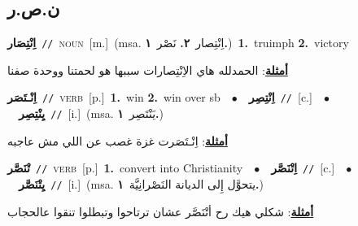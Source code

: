 \documentclass[10pt,a4paper,twoside]{article} %
\begin{document}
\begin{multicols}{2}
\vspace{-3mm}
\subsection*{\color{blue}\foreignlanguage{arabic}{ن.ص.ر}\color{blue}{}} 

{\setlength\topsep{0pt}\textbf{\foreignlanguage{arabic}{اِنْتِصَار}}\ {\color{gray}\texttt{//}\color{black}}\ \textsc{noun}\ [m.]\ \color{gray}(msa. \foreignlanguage{arabic}{اِنْتِصار}~\foreignlanguage{arabic}{\textbf{٢.}}  \foreignlanguage{arabic}{نَصْر}~\foreignlanguage{arabic}{\textbf{١.}})\color{black}\ \textbf{1.}~truimph  \textbf{2.}~victory\  \begin{flushright}\color{gray}\foreignlanguage{arabic}{\textbf{\underline{\foreignlanguage{arabic}{أمثلة}}}: الحمدلله هاي الاِنْتِصارات سببها هو لحمتنا ووحدة صفنا}\end{flushright}\color{black}} \vspace{2mm}

{\setlength\topsep{0pt}\textbf{\foreignlanguage{arabic}{اِنْـتَصَر}}\ {\color{gray}\texttt{//}\color{black}}\ \textsc{verb}\ [p.]\ \textbf{1.}~win  \textbf{2.}~win over sb\ \ $\bullet$\ \ \setlength\topsep{0pt}\textbf{\foreignlanguage{arabic}{اِنْتِصِر}}\ {\color{gray}\texttt{//}\color{black}}\ [c.]\ \ $\bullet$\ \ \setlength\topsep{0pt}\textbf{\foreignlanguage{arabic}{يِنْتِصِر}}\ {\color{gray}\texttt{//}\color{black}}\ [i.]\ \color{gray}(msa. \foreignlanguage{arabic}{يَنْتَصِر}~\foreignlanguage{arabic}{\textbf{١.}})\color{black}\  \begin{flushright}\color{gray}\foreignlanguage{arabic}{\textbf{\underline{\foreignlanguage{arabic}{أمثلة}}}: اِنْـتَصَرت غزة غصب عن اللي مش عاجبه}\end{flushright}\color{black}} \vspace{2mm}

{\setlength\topsep{0pt}\textbf{\foreignlanguage{arabic}{تْنَصَّر}}\ {\color{gray}\texttt{//}\color{black}}\ \textsc{verb}\ [p.]\ \textbf{1.}~convert into Christianity\ \ $\bullet$\ \ \setlength\topsep{0pt}\textbf{\foreignlanguage{arabic}{اِتْنَصَّر}}\ {\color{gray}\texttt{//}\color{black}}\ [c.]\ \ $\bullet$\ \ \setlength\topsep{0pt}\textbf{\foreignlanguage{arabic}{يِتْنَصَّر}}\ {\color{gray}\texttt{//}\color{black}}\ [i.]\ \color{gray}(msa. \foreignlanguage{arabic}{يتحوَّل إِلى الديانة النَصْرانِيَّة}~\foreignlanguage{arabic}{\textbf{١.}})\color{black}\  \begin{flushright}\color{gray}\foreignlanguage{arabic}{\textbf{\underline{\foreignlanguage{arabic}{أمثلة}}}: شكلي هيك رح أتْنَصَّر عشان ترتاحوا وتبطلوا تنقوا عالحجاب}\end{flushright}\color{black}} \vspace{2mm}


\end{multicols}
\end{document}

